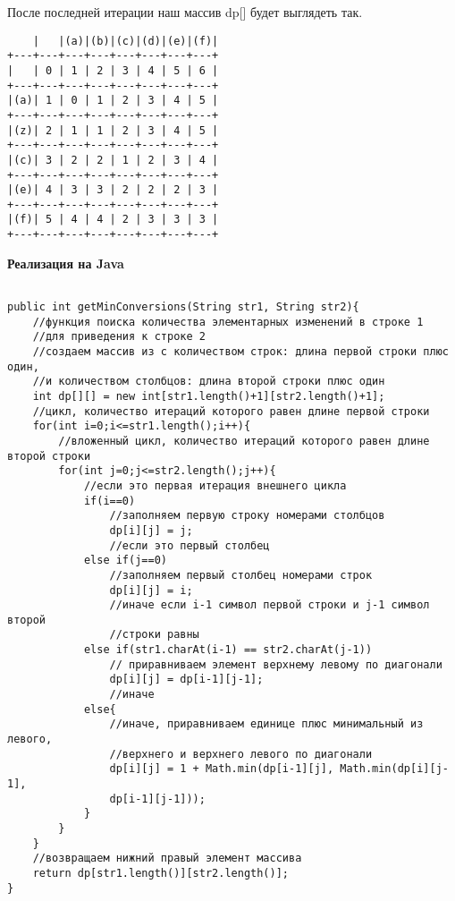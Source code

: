 После последней итерации наш массив dp[] будет выглядеть так.

\newpage

\begin{tcolorbox}
\begin{verbatim}
    |   |(a)|(b)|(c)|(d)|(e)|(f)|
+---+---+---+---+---+---+---+---+
|   | 0 | 1 | 2 | 3 | 4 | 5 | 6 |
+---+---+---+---+---+---+---+---+
|(a)| 1 | 0 | 1 | 2 | 3 | 4 | 5 |
+---+---+---+---+---+---+---+---+
|(z)| 2 | 1 | 1 | 2 | 3 | 4 | 5 |
+---+---+---+---+---+---+---+---+
|(c)| 3 | 2 | 2 | 1 | 2 | 3 | 4 |
+---+---+---+---+---+---+---+---+
|(e)| 4 | 3 | 3 | 2 | 2 | 2 | 3 |
+---+---+---+---+---+---+---+---+
|(f)| 5 | 4 | 4 | 2 | 3 | 3 | 3 |
+---+---+---+---+---+---+---+---+
\end{verbatim}
\end{tcolorbox}

\textbf{Реализация на Java}

\begin{tcolorbox}
\begin{verbatim}

public int getMinConversions(String str1, String str2){
	//функция поиска количества элементарных изменений в строке 1 
	//для приведения к строке 2
	//создаем массив из с количеством строк: длина первой строки плюс один, 
	//и количеством столбцов: длина второй строки плюс один
	int dp[][] = new int[str1.length()+1][str2.length()+1];
	//цикл, количество итераций которого равен длине первой строки
	for(int i=0;i<=str1.length();i++){
		//вложенный цикл, количество итераций которого равен длине второй строки
		for(int j=0;j<=str2.length();j++){
			//если это первая итерация внешнего цикла
			if(i==0)
				//заполняем первую строку номерами столбцов
				dp[i][j] = j;
				//если это первый столбец
			else if(j==0)
				//заполняем первый столбец номерами строк
				dp[i][j] = i;
				//иначе если i-1 символ первой строки и j-1 символ второй 
				//строки равны
			else if(str1.charAt(i-1) == str2.charAt(j-1))
				// приравниваем элемент верхнему левому по диагонали
				dp[i][j] = dp[i-1][j-1];
				//иначе
			else{
				//иначе, приравниваем единице плюс минимальный из левого, 
				//верхнего и верхнего левого по диагонали
				dp[i][j] = 1 + Math.min(dp[i-1][j], Math.min(dp[i][j-1], 
				dp[i-1][j-1]));
			}
		}
	}
	//возвращаем нижний правый элемент массива
	return dp[str1.length()][str2.length()];
}

\end{verbatim}
\end{tcolorbox}
